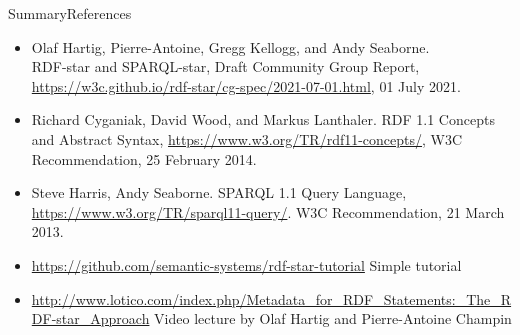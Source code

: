 \documentclass[aspectratio=169]{beamer}
\begin{document}
\begin{frame}{Summary}{References}
	\begin{itemize}
		\item Olaf Hartig, Pierre-Antoine, Gregg Kellogg, and Andy Seaborne. \\ RDF-star and SPARQL-star, Draft Community Group Report, \url{https://w3c.github.io/rdf-star/cg-spec/2021-07-01.html}, 01 July 2021.
		\item Richard Cyganiak, David Wood, and Markus Lanthaler. RDF 1.1 Concepts and Abstract Syntax, \url{https://www.w3.org/TR/rdf11-concepts/}, W3C Recommendation, 25 February 2014.
		\item Steve Harris, Andy Seaborne. SPARQL 1.1 Query Language, \url{https://www.w3.org/TR/sparql11-query/}. W3C Recommendation, 21 March 2013.
		\item \url{https://github.com/semantic-systems/rdf-star-tutorial} Simple tutorial 
		\item \url{http://www.lotico.com/index.php/Metadata_for_RDF_Statements:_The_RDF-star_Approach} Video lecture by Olaf Hartig and Pierre-Antoine Champin
\end{itemize}
\end{frame}
\end{document}
